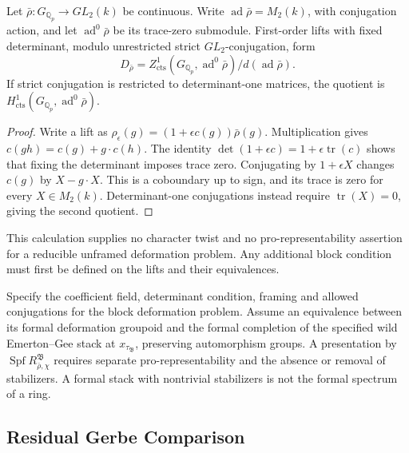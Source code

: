 \begin{lemma}
\label{v4-arith:w6-f:lem:representability}
Let \(\bar\rho:G_{\mathbb Q_p}\to GL_2(k)\) be continuous.
Write \(\operatorname{ad}\bar\rho=M_2(k)\), with conjugation action,
and let \(\operatorname{ad}^0\bar\rho\) be its trace-zero submodule.
First-order lifts with fixed determinant, modulo unrestricted strict
\(GL_2\)-conjugation, form
\[
 D_{\bar\rho}=Z^1_{\mathrm{cts}}(G_{\mathbb Q_p},
 \operatorname{ad}^0\bar\rho)/d(\operatorname{ad}\bar\rho).
\]
If strict conjugation is restricted to determinant-one matrices,
the quotient is \(H^1_{\mathrm{cts}}(G_{\mathbb Q_p},
\operatorname{ad}^0\bar\rho)\).
\end{lemma}
\begin{proof}
Write a lift as
\(\rho_\epsilon(g)=(1+\epsilon c(g))\bar\rho(g)\).
Multiplication gives \(c(gh)=c(g)+g\cdot c(h)\).
The identity \(\det(1+\epsilon c)=1+\epsilon\operatorname{tr}(c)\)
shows that fixing the determinant imposes trace zero.
Conjugating by \(1+\epsilon X\) changes \(c(g)\) by
\(X-g\cdot X\). This is a coboundary up to sign, and its trace is
zero for every \(X\in M_2(k)\). Determinant-one conjugations
instead require \(\operatorname{tr}(X)=0\), giving the second quotient.
\end{proof}

This calculation supplies no character twist and no pro-representability
assertion for a reducible unframed deformation problem. Any additional
block condition must first be defined on the lifts and their equivalences.

\begin{hypothesis}
\label{v4-arith:w6-f:lem:block-match-EG}
Specify the coefficient field, determinant condition, framing and
allowed conjugations for the block deformation problem. Assume an
equivalence between its formal deformation groupoid and the formal
completion of the specified wild Emerton--Gee stack at
\(x_{\tau_{\mathfrak B}}\), preserving automorphism groups.
A presentation by \(\operatorname{Spf}R^{\mathfrak B}_{\bar\rho,\chi}\)
requires separate pro-representability and the absence or removal of
stabilizers. A formal stack with nontrivial stabilizers is not the
formal spectrum of a ring.
\end{hypothesis}

\subsection{Residual Gerbe Comparison}

